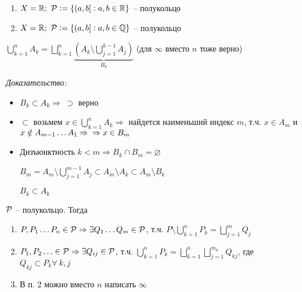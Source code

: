 \documentclass[12pt]{article}
\begin{document}
\begin{Example}{}
    \begin{enumerate}
        \item $X = \R;\ \P := \{(a, b] : a, b \in \R\}$ -- полукольцо
        \item $X = \R;\ \P := \{(a, b] : a, b \in \Q\}$ -- полукольцо
    \end{enumerate}
\end{Example}

\begin{lem}{}
    $\bigcup\limits_{k = 1}^n A_k = \bigsqcup\limits_{k = 1}^n \underbrace{(A_k \setminus \bigcup\limits_{j = 1}^{k - 1} A_j)}_{B_k}$ (для $\infty$ вместо $n$ тоже верно)
\end{lem}

\textit{Доказательство:}

\begin{itemize}
    \item $B_k \subset A_k \Rightarrow\ \supset$ верно
    \item $\subset$ возьмем $x \in \bigcup\limits_{k = 1}^n A_k \Rightarrow$ найдется наименьший индекс $m$, т.ч. $x \in A_m$ и $x \notin A_{m - 1} \ldots A_1 \Rightarrow \\ \Rightarrow x \in B_m$
    \item Дизъюнктность $k < m \Rightarrow B_k \cap B_m = \varnothing$

    $B_m = A_m \setminus \bigcup\limits_{j = 1}^{m - 1} A_j \subset A_m \setminus A_k \subset A_m \setminus B_k$
    
    $B_k \subset A_k$
\end{itemize}

\begin{theo}{}
    $\P$ -- полукольцо. Тогда

    \begin{enumerate}
        \item $P, P_1 \ldots P_n \in \P \Rightarrow \exists Q_1 \ldots Q_m \in \P$, т.ч. $P \setminus \bigcup\limits_{k = 1}^n P_k = \bigsqcup\limits_{j = 1}^m Q_j$
        \item $P_1, P_2 \ldots \in \P \Rightarrow \exists Q_{ij} \in \P$, т.ч. $\bigcup\limits_{k = 1}^n P_k = \bigsqcup\limits_{k = 1}^n\bigsqcup\limits_{j = 1}^{m_k} Q_{kj}$, где $Q_{kj} \subset P_k \forall\ k, j$
        \item В п. 2 можно вместо $n$ написать $\infty$
    \end{enumerate}
\end{theo}
\end{document}
